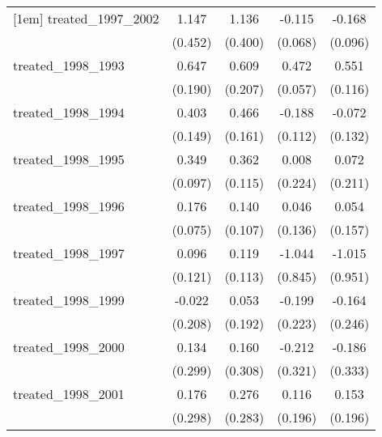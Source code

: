 {\begin{tabular}{l*{4}{c}}
[1em]
treated\_1997\_2002&       1.147\sym{*}  &       1.136\sym{**} &      -0.115         &      -0.168         \\
            &     (0.452)         &     (0.400)         &     (0.068)         &     (0.096)         \\
[1em]
treated\_1998\_1993&       0.647\sym{***}&       0.609\sym{**} &       0.472\sym{***}&       0.551\sym{***}\\
            &     (0.190)         &     (0.207)         &     (0.057)         &     (0.116)         \\
[1em]
treated\_1998\_1994&       0.403\sym{**} &       0.466\sym{**} &      -0.188         &      -0.072         \\
            &     (0.149)         &     (0.161)         &     (0.112)         &     (0.132)         \\
[1em]
treated\_1998\_1995&       0.349\sym{***}&       0.362\sym{**} &       0.008         &       0.072         \\
            &     (0.097)         &     (0.115)         &     (0.224)         &     (0.211)         \\
[1em]
treated\_1998\_1996&       0.176\sym{*}  &       0.140         &       0.046         &       0.054         \\
            &     (0.075)         &     (0.107)         &     (0.136)         &     (0.157)         \\
[1em]
treated\_1998\_1997&       0.096         &       0.119         &      -1.044         &      -1.015         \\
            &     (0.121)         &     (0.113)         &     (0.845)         &     (0.951)         \\
[1em]
treated\_1998\_1999&      -0.022         &       0.053         &      -0.199         &      -0.164         \\
            &     (0.208)         &     (0.192)         &     (0.223)         &     (0.246)         \\
[1em]
treated\_1998\_2000&       0.134         &       0.160         &      -0.212         &      -0.186         \\
            &     (0.299)         &     (0.308)         &     (0.321)         &     (0.333)         \\
[1em]
treated\_1998\_2001&       0.176         &       0.276         &       0.116         &       0.153         \\
            &     (0.298)         &     (0.283)         &     (0.196)         &     (0.196)         \\

\end{tabular}}
